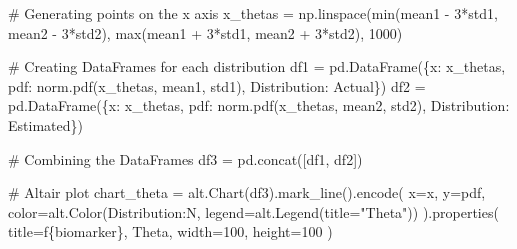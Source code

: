 \documentclass[
  letterpaper,
  DIV=11,
  numbers=noendperiod]{scrreprt}
\newenvironment{Shaded}{\begin{snugshade}}{\end{snugshade}}
\newcommand{\BuiltInTok}[1]{\textcolor[rgb]{0.00,0.23,0.31}{#1}}
\newcommand{\CommentTok}[1]{\textcolor[rgb]{0.37,0.37,0.37}{#1}}
\newcommand{\DecValTok}[1]{\textcolor[rgb]{0.68,0.00,0.00}{#1}}
\newcommand{\NormalTok}[1]{\textcolor[rgb]{0.00,0.23,0.31}{#1}}
\newcommand{\OperatorTok}[1]{\textcolor[rgb]{0.37,0.37,0.37}{#1}}
\newcommand{\SpecialCharTok}[1]{\textcolor[rgb]{0.37,0.37,0.37}{#1}}
\newcommand{\SpecialStringTok}[1]{\textcolor[rgb]{0.13,0.47,0.30}{#1}}
\newcommand{\StringTok}[1]{\textcolor[rgb]{0.13,0.47,0.30}{#1}}
\begin{document}
\begin{Shaded}
\begin{Highlighting}[]
        \CommentTok{\# Generating points on the x axis}
\NormalTok{        x\_thetas }\OperatorTok{=}\NormalTok{ np.linspace(}\BuiltInTok{min}\NormalTok{(mean1 }\OperatorTok{{-}} \DecValTok{3}\OperatorTok{*}\NormalTok{std1, mean2 }\OperatorTok{{-}} \DecValTok{3}\OperatorTok{*}\NormalTok{std2), }
                        \BuiltInTok{max}\NormalTok{(mean1 }\OperatorTok{+} \DecValTok{3}\OperatorTok{*}\NormalTok{std1, mean2 }\OperatorTok{+} \DecValTok{3}\OperatorTok{*}\NormalTok{std2), }\DecValTok{1000}\NormalTok{)}

        \CommentTok{\# Creating DataFrames for each distribution}
\NormalTok{        df1 }\OperatorTok{=}\NormalTok{ pd.DataFrame(\{}\StringTok{\textquotesingle{}x\textquotesingle{}}\NormalTok{: x\_thetas, }\StringTok{\textquotesingle{}pdf\textquotesingle{}}\NormalTok{: norm.pdf(x\_thetas, mean1, std1), }\StringTok{\textquotesingle{}Distribution\textquotesingle{}}\NormalTok{: }\StringTok{\textquotesingle{}Actual\textquotesingle{}}\NormalTok{\})}
\NormalTok{        df2 }\OperatorTok{=}\NormalTok{ pd.DataFrame(\{}\StringTok{\textquotesingle{}x\textquotesingle{}}\NormalTok{: x\_thetas, }\StringTok{\textquotesingle{}pdf\textquotesingle{}}\NormalTok{: norm.pdf(x\_thetas, mean2, std2), }\StringTok{\textquotesingle{}Distribution\textquotesingle{}}\NormalTok{: }\StringTok{\textquotesingle{}Estimated\textquotesingle{}}\NormalTok{\})}

        \CommentTok{\# Combining the DataFrames}
\NormalTok{        df3 }\OperatorTok{=}\NormalTok{ pd.concat([df1, df2])}

        \CommentTok{\# Altair plot}
\NormalTok{        chart\_theta }\OperatorTok{=}\NormalTok{ alt.Chart(df3).mark\_line().encode(}
\NormalTok{            x}\OperatorTok{=}\StringTok{\textquotesingle{}x\textquotesingle{}}\NormalTok{,}
\NormalTok{            y}\OperatorTok{=}\StringTok{\textquotesingle{}pdf\textquotesingle{}}\NormalTok{,}
\NormalTok{            color}\OperatorTok{=}\NormalTok{alt.Color(}\StringTok{\textquotesingle{}Distribution:N\textquotesingle{}}\NormalTok{, legend}\OperatorTok{=}\NormalTok{alt.Legend(title}\OperatorTok{=}\StringTok{"Theta"}\NormalTok{))}
\NormalTok{        ).properties(}
\NormalTok{            title}\OperatorTok{=}\SpecialStringTok{f\textquotesingle{}}\SpecialCharTok{\{}\NormalTok{biomarker}\SpecialCharTok{\}}\SpecialStringTok{, Theta\textquotesingle{}}\NormalTok{,}
\NormalTok{            width}\OperatorTok{=}\DecValTok{100}\NormalTok{,}
\NormalTok{            height}\OperatorTok{=}\DecValTok{100}
\NormalTok{            )}


\end{Highlighting}
\end{Shaded}
\end{document}
